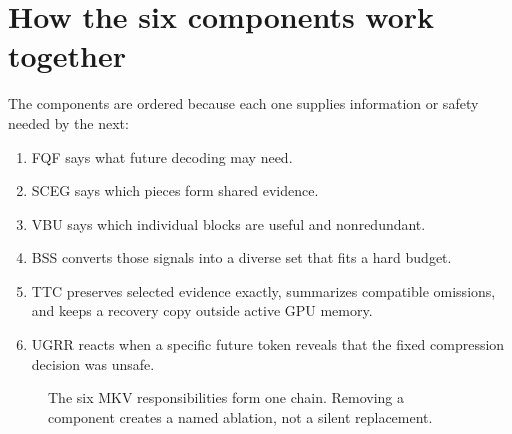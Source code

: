 \documentclass[11pt]{article}
\begin{document}
\section{How the six components work together}
\label{sec:why-combination}

The components are ordered because each one supplies information or safety needed by the next:

\begin{enumerate}
  \item FQF says what future decoding may need.
  \item SCEG says which pieces form shared evidence.
  \item VBU says which individual blocks are useful and nonredundant.
  \item BSS converts those signals into a diverse set that fits a hard budget.
  \item TTC preserves selected evidence exactly, summarizes compatible omissions, and keeps a
        recovery copy outside active GPU memory.
  \item UGRR reacts when a specific future token reveals that the fixed compression decision was
        unsafe.
\end{enumerate}

\begin{figure}[htbp]
\centering
{}
\caption{The six MKV responsibilities form one chain. Removing a component creates a named
ablation, not a silent replacement.}
\label{fig:six-chain}
\end{figure}
\end{document}
